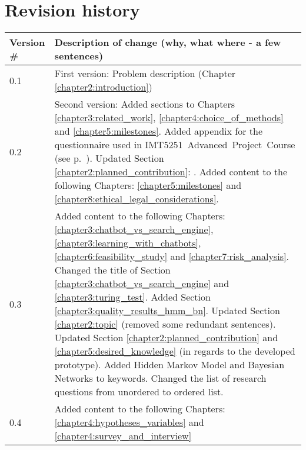 \chapter*{Revision history}

\begin{center}
	\begin{tabular}[H]{|l|p{35em}|}
		\hline
		Version \#  & Description of change (why, what where - a few sentences)\\
		\hline
		0.1   & First version: Problem description (Chapter \ref{chapter2:introduction})\\
		\hline
		0.2   & Second version: Added sections to Chapters \ref{chapter3:related_work}, \ref{chapter4:choice_of_methods} and \ref{chapter5:milestones}. 
		\newline  
		Added appendix for the questionnaire used in \newline IMT5251~Advanced~Project~Course (see p.~\pageref{appendix:questionnaire}).
		\newline  
		Updated Section \ref{chapter2:planned_contribution}: \nameref{chapter2:planned_contribution}.
		\newline  
		Added content to the following Chapters: \ref{chapter5:milestones} and \ref{chapter8:ethical_legal_considerations}. \\
		\hline
		0.3   & Added content to the following Chapters: \ref{chapter3:chatbot_vs_search_engine}, \ref{chapter3:learning_with_chatbots}, 
		\ref{chapter6:feasibility_study} and \ref{chapter7:risk_analysis}. \newline
		Changed the title of Section \ref{chapter3:chatbot_vs_search_engine} and \ref{chapter3:turing_test}. 
		Added Section \ref{chapter3:quality_results_hmm_bn}. \newline
		Updated Section \ref{chapter2:topic} (removed some redundant sentences). \newline
		Updated Section \ref{chapter2:planned_contribution} and \ref{chapter5:desired_knowledge} (in regards to the developed prototype). \newline
		Added Hidden Markov Model and Bayesian Networks to keywords. \newline
		Changed the list of research questions from unordered to ordered list.	\\
		\hline
		0.4   & Added content to the following Chapters: \ref{chapter4:hypotheses_variables} and \ref{chapter4:survey_and_interview} \\
		\hline
	\end{tabular}
\end{center}
